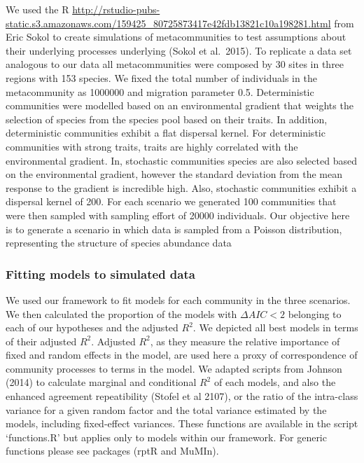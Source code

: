 We used the R
\href{package MCSIM}{http://rstudio-pubs-static.s3.amazonaws.com/159425_80725873417e42fdb13821c10a198281.html} from Eric Sokol to create simulations of metacommunities to test
assumptions about their underlying processes underlying (Sokol et
al.~2015). To replicate a data set analogous to our data all
metacommunities were composed by 30 sites in three regions with 153
species. We fixed the total number of individuals in the metacommunity
as 1000000 and migration parameter 0.5. Deterministic communities were
modelled based on an environmental gradient that weights the selection
of species from the species pool based on their traits. In addition,
deterministic communities exhibit a flat dispersal kernel. For
deterministic communities with strong traits, traits are highly
correlated with the environmental gradient. In, stochastic communities
species are also selected based on the environmental gradient, however
the standard deviation from the mean response to the gradient is
incredible high. Also, stochastic communities exhibit a dispersal
kernel of 200. For each scenario we generated 100 communities that were
then sampled with sampling effort of 20000 individuals. Our objective
here is to generate a scenario in which data is sampled from a Poisson
distribution, representing the structure of species abundance data

\subsubsection*{Fitting models to simulated
data}\label{fitting-models-to-simulated-data}

We used our framework to fit models for each community in the three
scenarios. We then calculated the proportion of the models with
\(\Delta{AIC} < 2\) belonging to each of our hypotheses and the adjusted
\(R^{2}\). We depicted all best models in terms of their adjusted
\(R^{2}\). Adjusted \(R^{2}\), as they measure the relative importance
of fixed and random effects in the model, are used here a proxy of
correspondence of community processes to terms in the model. We adapted
scripts from Johnson (2014) to calculate marginal and conditional
\(R^{2}\) of each models, and also the enhanced agreement repeatibility
(Stofel et al 2107), or the ratio of the intra-class variance for a
given random factor and the total variance estimated by the models,
including fixed-effect variances. These functions are available in the
script `functions.R' but applies only to models within our framework.
For generic functions please see packages (rptR and MuMIn).


